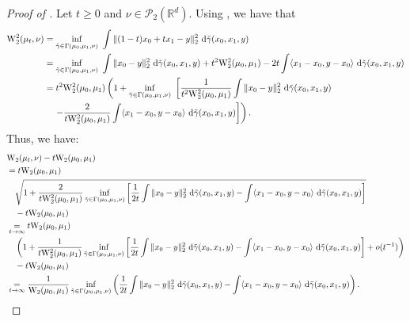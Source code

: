 \documentclass[twoside]{article}
\newcommand{\W}{\mathrm{W}}
\begin{document}
\begin{proof}[Proof of ]
    Let $t\ge 0$ and $\nu\in\mathcal{P}_2(\mathbb{R}^d)$. Using , we have that
    \begin{equation}
        \begin{aligned}
            \W_2^2(\mu_t,\nu) &= \inf_{\Tilde{\gamma}\in\Gamma(\mu_0, \mu_1, \nu)}\ \int \|(1-t)x_0 +tx_1 - y\|_2^2\ \mathrm{d}\Tilde{\gamma}(x_0,x_1,y) \\
            &= \inf_{\Tilde{\gamma}\in\Gamma(\mu_0,\mu_1,\nu)}\ \int \|x_0-y\|_2^2\ \mathrm{d}\Tilde{\gamma}(x_0,x_1,y) + t^2 \W_2^2(\mu_0,\mu_1) - 2t \int \langle x_1-x_0, y-x_0\rangle\ \mathrm{d}\Tilde{\gamma}(x_0,x_1,y) \\
        &= t^2 \W_2^2(\mu_0,\mu_1) \left(1 + \inf_{\Tilde{\gamma}\in\Gamma(\mu_0,\mu_1,\nu)}\ \left[ \frac{1}{t^2 \W_2^2(\mu_0,\mu_1)} \int \|x_0-y\|_2^2\ \mathrm{d}\Tilde{\gamma}(x_0,x_1,y) \right.\right. \\ &\left.\left. \quad- \frac{2}{t \W_2^2(\mu_0,\mu_1)}\int \langle x_1-x_0, y-x_0\rangle\ \mathrm{d}\Tilde{\gamma}(x_0,x_1,y)\right]\right).
        \end{aligned}
    \end{equation}
    Thus, we have:
    \begin{equation}
        \begin{aligned}
            &\W_2(\mu_t,\nu) - t\W_2(\mu_0,\mu_1) \\
            &= t\W_2(\mu_0,\mu_1) \\ &\quad \sqrt{1 + \frac{2}{t\W_2^2(\mu_0,\mu_1)} \inf_{\Tilde{\gamma}\in\Gamma(\mu_0,\mu_1,\nu)} \left[ \frac{1}{2t}\int \|x_0-y\|_2^2 \ \mathrm{d}\Tilde{\gamma}(x_0,x_1,y) - \int \langle x_1-x_0, y-x_0\rangle\ \mathrm{d}\Tilde{\gamma}(x_0,x_1,y)\right]} \\ &\quad - t\W_2(\mu_0,\mu_1) \\
            &\underset{t\to\infty}{=} t\W_2(\mu_0,\mu_1) \\ &\quad \left(1 + \frac{1}{t\W_2^2(\mu_0,\mu_1)} \inf_{\Tilde{\gamma}\in\Gamma(\mu_0,\mu_1,\nu)} \left[\frac{1}{2t}\int \|x_0-y\|_2^2 \ \mathrm{d}\Tilde{\gamma}(x_0,x_1,y) - \int \langle x_1-x_0, y-x_0\rangle\ \mathrm{d}\Tilde{\gamma}(x_0,x_1,y) \right] + o(t^{-1})\right) \\ &\quad - t\W_2(\mu_0,\mu_1) \\
            &\underset{t\to\infty}{=}  \frac{1}{\W_2(\mu_0,\mu_1)} \inf_{\Tilde{\gamma}\in\Gamma(\mu_0,\mu_1,\nu)} \left(\frac{1}{2t}\int \|x_0-y\|_2^2 \ \mathrm{d}\Tilde{\gamma}(x_0,x_1,y) - \int \langle x_1-x_0, y-x_0\rangle\ \mathrm{d}\Tilde{\gamma}(x_0,x_1,y)\right).
        \end{aligned}
    \end{equation}


\end{proof}
\end{document}
